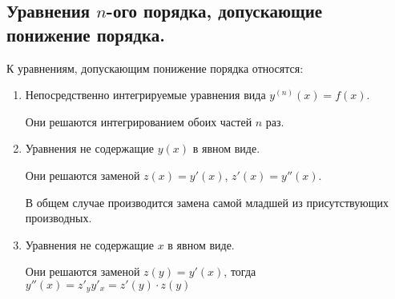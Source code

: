 \subsection{%
  Уравнения \(n\)-ого порядка, допускающие понижение порядка.%
}

К уравнениям, допускающим понижение порядка относятся:

\begin{enumerate}
  \item Непосредственно интегрируемые уравнения вида \(y^{(n)}(x) = f(x)\).
  
  Они решаются интегрированием обоих частей \(n\) раз.

  \item Уравнения не содержащие \(y(x)\) в явном виде.
  
  Они решаются заменой \(z(x) = y'(x)\), \(z'(x) = y''(x)\).

  \begin{remark}
    В общем случае производится замена самой младшей из присутствующих
    производных.
  \end{remark}

  \item Уравнения не содержащие \(x\) в явном виде.
  
  Они решаются заменой \(z(y) = y'(x)\), тогда
  \(y''(x) = z'_{y} y'_{x} = z'(y) \cdot z(y)\)
\end{enumerate}
